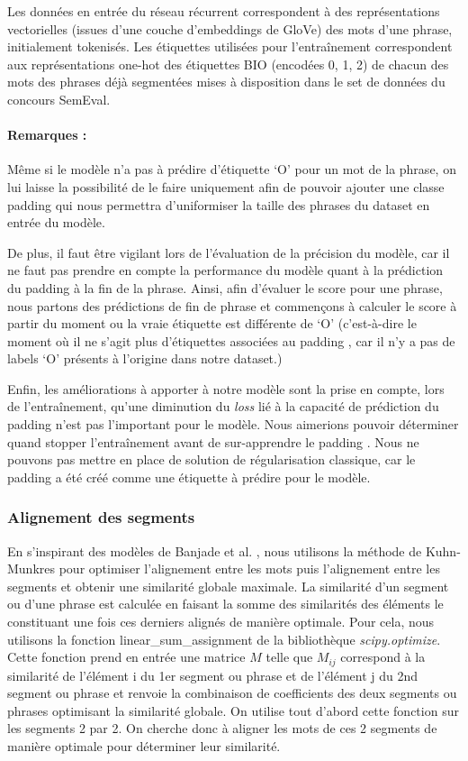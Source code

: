 \documentclass[a4paper, twoside, 11pt]{article}
\begin{document}
Les données en entrée du réseau récurrent correspondent à des représentations vectorielles (issues d’une couche d’embeddings de GloVe) des mots d’une phrase, initialement tokenisés. Les étiquettes utilisées pour l'entraînement correspondent aux représentations \og one-hot  \fg{} des étiquettes BIO (encodées 0, 1, 2) de chacun des mots des phrases déjà segmentées mises à disposition dans le set de données du concours SemEval.

 \paragraph{Remarques :}
 Même si le modèle n’a pas à prédire d’étiquette ‘O’ pour un mot de la phrase, on lui laisse la possibilité de le faire uniquement afin de pouvoir ajouter une classe \og padding \fg{} qui nous permettra d’uniformiser la taille des phrases du dataset en entrée du modèle.

De plus, il faut être vigilant lors de l’évaluation de la précision du modèle, car il ne faut pas prendre en compte la performance du modèle quant à la prédiction du \og padding \fg{} à la fin de la phrase. Ainsi, afin d’évaluer le score pour une phrase, nous partons des prédictions de fin de phrase et commençons à calculer le score à partir du moment ou la vraie étiquette est différente de ‘O’ (c'est-à-dire le moment où il ne s’agit plus d'étiquettes associées au \og padding \fg{}, car il n’y a pas de labels ‘O’ présents à l’origine dans notre dataset.)

Enfin, les améliorations à apporter à notre modèle sont la prise en compte, lors de l’entraînement, qu’une diminution du \textit{loss} lié à la capacité de prédiction du \og padding \fg{} n’est pas l’important pour le modèle. Nous aimerions pouvoir déterminer quand stopper l’entraînement avant de sur-apprendre le \og padding \fg{}. Nous ne pouvons pas mettre en place de solution de régularisation classique, car le \og padding \fg{} a été créé comme une étiquette à prédire pour le modèle.

\subsubsection{Alignement des segments}

En s’inspirant des modèles de Banjade et al. \cite{banjade}  \cite{banjadeautre}, nous utilisons la méthode de Kuhn-Munkres pour optimiser l’alignement entre les mots puis l’alignement entre les segments et obtenir une similarité globale maximale. La similarité d’un segment ou d’une phrase est calculée en faisant la somme des similarités des éléments le constituant une fois ces derniers alignés de manière optimale. Pour cela, nous utilisons la fonction \og linear\_sum\_assignment \fg{} de la bibliothèque \textit{scipy.optimize}. Cette fonction prend en entrée une matrice $M$ telle que $M_{ij}$ correspond à la similarité de l’élément i du 1er segment ou phrase et de l’élément j du 2nd segment ou phrase et renvoie la combinaison de coefficients des deux segments ou phrases optimisant la similarité globale. On utilise tout d’abord cette fonction sur les segments 2 par 2. On cherche donc à aligner les mots de ces 2 segments de manière optimale pour déterminer leur similarité.
\end{document}
